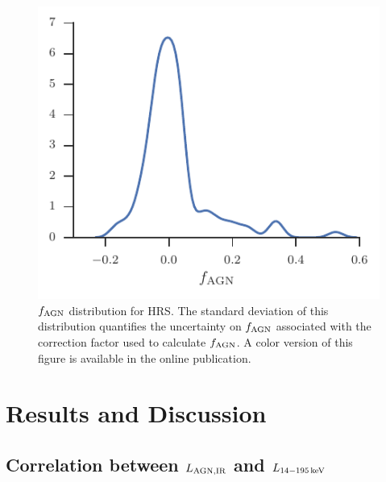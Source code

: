 \documentclass[fleqn, usenatbib]{mnras}
\begin{document}
\begin{figure}
\includegraphics[width=\columnwidth]{figures/fagn_nonAGN_hrs_mass_select}
\caption{$f_{\rm AGN}$ distribution for HRS. The standard deviation of this distribution quantifies the uncertainty on $f_{\rm AGN}$ associated with the correction factor used to calculate $f_{\rm AGN}$. A color version of this figure is available in the online publication. \label{fig:fagn_nonAGN}}
\end{figure}

\section{Results and Discussion}

\subsection{Correlation between $L_{\rm AGN, IR}$ and $L_{\rm 14-195\,keV}$}\label{sec:lagnIR_lbat_correlation}
\end{document}
